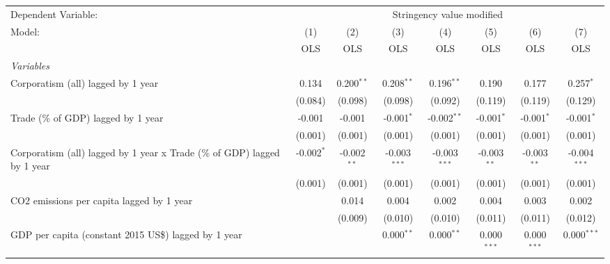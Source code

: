 
\begingroup
\centering
\begin{tabular}{lccccccc}
   \toprule
   Dependent Variable: & \multicolumn{7}{c}{Stringency value modified}\\
   Model:                                                                   & (1)          & (2)           & (3)            & (4)            & (5)           & (6)           & (7)\\  
                                                                            &  OLS         & OLS           & OLS            & OLS            & OLS           & OLS           & OLS\\  
   \midrule
   \emph{Variables}\\
   Corporatism (all) lagged by 1 year                                       & 0.134        & 0.200$^{**}$  & 0.208$^{**}$   & 0.196$^{**}$   & 0.190         & 0.177         & 0.257$^{*}$\\   
                                                                            & (0.084)      & (0.098)       & (0.098)        & (0.092)        & (0.119)       & (0.119)       & (0.129)\\   
   Trade (\% of GDP) lagged by 1 year                                       & -0.001       & -0.001        & -0.001$^{*}$   & -0.002$^{**}$  & -0.001$^{*}$  & -0.001$^{*}$  & -0.001$^{*}$\\   
                                                                            & (0.001)      & (0.001)       & (0.001)        & (0.001)        & (0.001)       & (0.001)       & (0.001)\\   
   Corporatism (all) lagged by 1 year x Trade (\% of GDP) lagged by 1 year  & -0.002$^{*}$ & -0.002$^{**}$ & -0.003$^{***}$ & -0.003$^{***}$ & -0.003$^{**}$ & -0.003$^{**}$ & -0.004$^{***}$\\   
                                                                            & (0.001)      & (0.001)       & (0.001)        & (0.001)        & (0.001)       & (0.001)       & (0.001)\\   
   CO2 emissions per capita lagged by 1 year                                &              & 0.014         & 0.004          & 0.002          & 0.004         & 0.003         & 0.002\\   
                                                                            &              & (0.009)       & (0.010)        & (0.010)        & (0.011)       & (0.011)       & (0.012)\\   
   GDP per capita (constant 2015 US\$) lagged by 1 year                     &              &               & 0.000$^{**}$   & 0.000$^{**}$   & 0.000$^{***}$ & 0.000$^{***}$ & 0.000$^{***}$\\   

\end{tabular}
